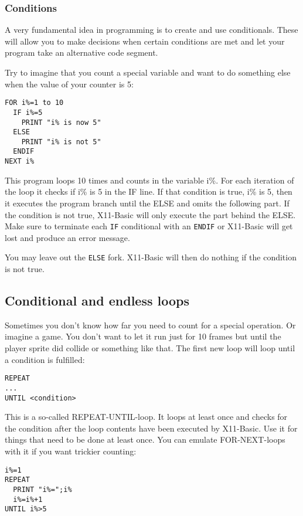 \subsubsection{Conditions}

A very fundamental idea in programming is to create and use conditionals. These
will allow you to make decisions when certain conditions are met and let your
program take an alternative code segment.

Try to imagine that you count a special variable and want to do something else
when the value of your counter is 5:
\begin{mdframed}[hidealllines=true,backgroundcolor=blue!20]
\begin{verbatim}
FOR i%=1 to 10
  IF i%=5
    PRINT "i% is now 5"
  ELSE
    PRINT "i% is not 5"
  ENDIF
NEXT i%
\end{verbatim}
\end{mdframed}

This program loops 10 times and counts in the variable i\%.
For each iteration of the loop it checks if i\% is 5 in the IF line. If that
condition is true, i\% is 5, then it executes the program branch until the ELSE
and omits the following part. If the condition is not true, X11-Basic will only
execute the part behind the ELSE. Make sure to terminate each \verb|IF| conditional
with an \verb|ENDIF| or X11-Basic will get lost and produce an error message. 

You may leave out the \verb|ELSE| fork. X11-Basic will then do nothing if the 
condition is not true.

\subsection{Conditional and endless loops}


Sometimes you don't know how far you need to count for a special operation. Or
imagine a game. You don't want to let it run just for 10 frames but until the
player sprite did collide or something like that. The first new loop will loop
until a condition is fulfilled:

\begin{verbatim}
REPEAT
...
UNTIL <condition>
\end{verbatim}

This is a so-called REPEAT-UNTIL-loop. It loops at least once and checks for
the condition after the loop contents have been executed by X11-Basic. Use it
for things that need to be done at least once. You can emulate FOR-NEXT-loops
with it if you want trickier counting:
\begin{mdframed}[hidealllines=true,backgroundcolor=blue!20]
\begin{verbatim}
i%=1
REPEAT
  PRINT "i%=";i%
  i%=i%+1
UNTIL i%>5
\end{verbatim}
\end{mdframed}

